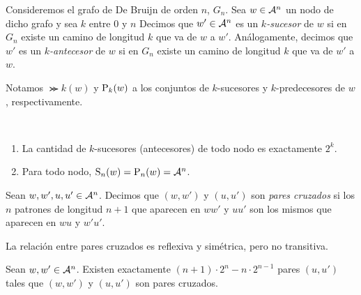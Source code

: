 \documentclass[11pt]{article}
\begin{document}
\begin{defi}
	Consideremos el grafo de De Bruijn de orden $n$, $G_n$. Sea $w \in
		\mathcal{A}^n$ un nodo  de dicho grafo
	y sea $k$ entre $0$ y $n$
	Decimos que $w' \in \mathcal{A}^n$ es un \emph{$k$-sucesor} de $w$ si en $G_n$
	existe un camino de longitud $k$ que va de $w$ a $w'$.
	Análogamente, decimos que $w'$ es un \emph{$k$-antecesor} de $w$ si en $G_n$
	existe un camino de longitud $k$ que va de $w'$ a $w$.

	Notamos $\Succ{k}(w)$ y $\text{P}_{k}(w)$ a los conjuntos de $k$-sucesores y
	$k$-predecesores de $w$, respectivamente.
\end{defi}

\begin{obs}\ %
	\begin{enumerate}
		\item La cantidad de $k$-sucesores (antecesores) de todo nodo es
		      exactamente $2^k$.
		\item Para todo nodo, $\text{S}_{n}(w) = \text{P}_{n}(w) = \mathcal{A}^n$.
	\end{enumerate}
\end{obs}

\begin{defi}
	Sean $w,w',u,u' \in \mathcal{A}^n$. Decimos que $(w,w')$ y $(u,u')$ son
	\emph{pares cruzados} si los $n$ patrones de longitud $n + 1$ que aparecen en
	$ww'$ y $uu'$ son los mismos que aparecen en $wu$ y $w'u'$.
\end{defi}

\begin{obs}
	La relación entre pares cruzados es reflexiva y simétrica, pero no
	transitiva.
\end{obs}

\begin{prop}
	Sean $w, w' \in \mathcal{A}^n$. Existen exactamente $(n + 1) \cdot 2^n - n
		\cdot 2^{n - 1}$ pares $(u, u')$ tales que $(w, w')$ y $(u, u')$ son pares
	cruzados.
\end{prop}
\end{document}
